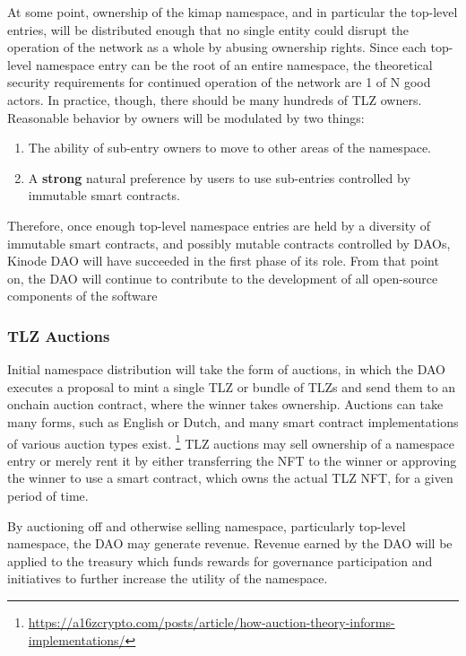 \documentclass[runningheads]{llncs}
\begin{document}
At some point, ownership of the kimap namespace, and in particular the top-level entries, will be distributed enough that no single entity could disrupt the operation of the network as a whole by abusing ownership rights.
Since each top-level namespace entry can be the root of an entire namespace, the theoretical security requirements for continued operation of the network are 1 of N good actors.
In practice, though, there should be many hundreds of TLZ owners.
Reasonable behavior by owners will be modulated by two things:
\begin{enumerate}
    \item The ability of sub-entry owners to move to other areas of the namespace.
    \item A \textbf{strong} natural preference by users to use sub-entries controlled by immutable smart contracts.
\end{enumerate}

Therefore, once enough top-level namespace entries are held by a diversity of immutable smart contracts, and possibly mutable contracts controlled by DAOs, Kinode DAO will have succeeded in the first phase of its role.
From that point on, the DAO will continue to contribute to the development of all open-source components of the software

\subsubsection{TLZ Auctions}
\label{sec:daotldauctions}

Initial namespace distribution will take the form of auctions, in which the DAO executes a proposal to mint a single TLZ or bundle of TLZs and send them to an onchain auction contract, where the winner takes ownership.
Auctions can take many forms, such as English or Dutch, and many smart contract implementations of various auction types exist.
\footnote{\url{https://a16zcrypto.com/posts/article/how-auction-theory-informs-implementations/}}
TLZ auctions may sell ownership of a namespace entry or merely rent it by either transferring the NFT to the winner or approving the winner to use a smart contract, which owns the actual TLZ NFT, for a given period of time.

By auctioning off and otherwise selling namespace, particularly top-level namespace, the DAO may generate revenue.
Revenue earned by the DAO will be applied to the treasury which funds rewards for governance participation and initiatives to further increase the utility of the namespace.
\end{document}
